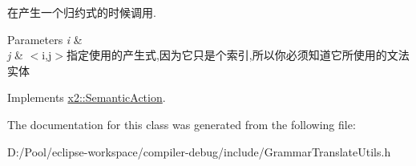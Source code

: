 在产生一个归约式的时候调用. 
\begin{DoxyParams}{Parameters}
{\em i} & \\
\hline
{\em j} & $<$i,j$>$指定使用的产生式,因为它只是个索引,所以你必须知道它所使用的文法实体 \\
\hline
\end{DoxyParams}


Implements \hyperlink{classx2_1_1_semantic_action_a859c5de657a2c684fef66e04a324e980}{x2\+::\+Semantic\+Action}.



The documentation for this class was generated from the following file\+:\begin{DoxyCompactItemize}
\item 
D\+:/\+Pool/eclipse-\/workspace/compiler-\/debug/include/Grammar\+Translate\+Utils.\+h\end{DoxyCompactItemize}
